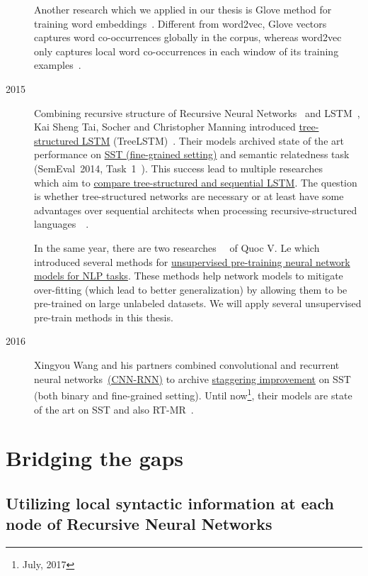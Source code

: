\begin{description}
Another research which we applied in our thesis is Glove method for training word embeddings~\cite{glove}.
Different from word2vec, Glove vectors captures word co-occurrences globally in the corpus, whereas word2vec only captures local word co-occurrences in each window of its training examples~\cite{glove}.

\item [2015] Combining recursive structure of Recursive Neural Networks~\cite{socher2013recursive} and LSTM~\cite{originLSTM}, Kai Sheng Tai, Socher and Christopher Manning introduced \hyperref[sec:treelstm]{tree-structured LSTM}  (TreeLSTM)~\cite{treeLSTM}.
Their models archived state of the art performance on \hyperref[sec:sst]{SST (fine-grained setting)} and semantic relatedness task (SemEval~2014, Task~1~\cite{SemeEvalTask1}).
This success lead to multiple researches~\cite{need-tree}~\cite{bowman-treevslstm}~\cite{Graves_Nature2016} which aim to \hyperref[treelstm-advantage]{compare tree-structured and sequential LSTM}.
The question is whether tree-structured networks are necessary or at least have some advantages over sequential architects when processing recursive-structured languages~\cite{need-tree}~\cite{bowman-treevslstm}.

In the same year, there are two researches~\cite{ParagraphVec}~\cite{semisup-seq2seq} of Quoc V. Le which introduced several methods for \hyperref[sec:unsupervised-pretrain]{unsupervised pre-training neural network models for NLP tasks}.
These methods help network models to mitigate over-fitting (which lead to better generalization) by allowing them to be pre-trained on large unlabeled datasets.
We will apply several unsupervised pre-train methods in this thesis.

\item [2016] Xingyou Wang and his partners combined convolutional and recurrent neural networks~\hyperref[cnn-rnn]{(CNN-RNN)} to archive \hyperref[table:cnn-rnn]{staggering improvement} on SST (both binary and fine-grained setting).
Until now\footnote{July, 2017}, their models are state of the art on SST and also RT-MR~\cite{cnn-rnn}.
\end{description}

\section{Bridging the gaps}
\subsection{Utilizing local syntactic information at each node of Recursive Neural Networks}
